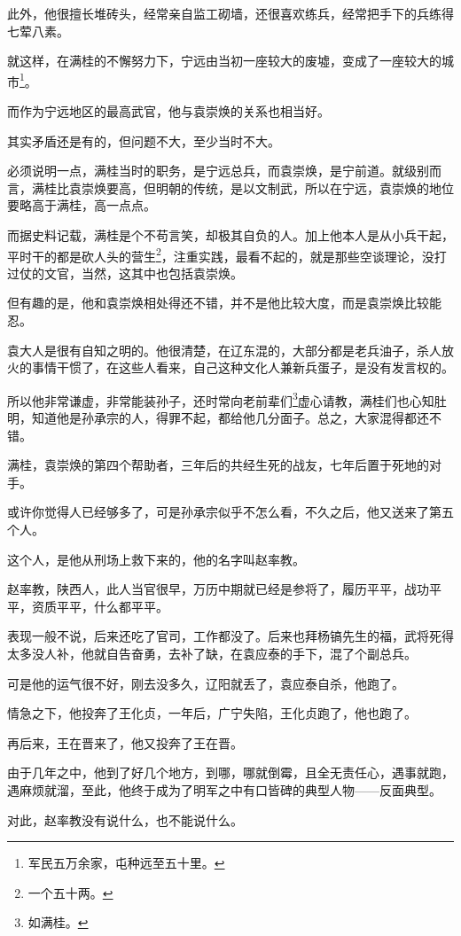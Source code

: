 \begin{multicols}{\theparacolNo}
		此外，他很擅长堆砖头，经常亲自监工砌墙，还很喜欢练兵，经常把手下的兵练得七荤八素。

		就这样，在满桂的不懈努力下，宁远由当初一座较大的废墟，变成了一座较大的城市\footnote{军民五万余家，屯种远至五十里。}。

		而作为宁远地区的最高武官，他与袁崇焕的关系也相当好。

		其实矛盾还是有的，但问题不大，至少当时不大。

		必须说明一点，满桂当时的职务，是宁远总兵，而袁崇焕，是宁前道。就级别而言，满桂比袁崇焕要高，但明朝的传统，是以文制武，所以在宁远，袁崇焕的地位要略高于满桂，高一点点。

		而据史料记载，满桂是个不苟言笑，却极其自负的人。加上他本人是从小兵干起，平时干的都是砍人头的营生\footnote{一个五十两。}，注重实践，最看不起的，就是那些空谈理论，没打过仗的文官，当然，这其中也包括袁崇焕。

		但有趣的是，他和袁崇焕相处得还不错，并不是他比较大度，而是袁崇焕比较能忍。

		袁大人是很有自知之明的。他很清楚，在辽东混的，大部分都是老兵油子，杀人放火的事情干惯了，在这些人看来，自己这种文化人兼新兵蛋子，是没有发言权的。

		所以他非常谦虚，非常能装孙子，还时常向老前辈们\footnote{如满桂。}虚心请教，满桂们也心知肚明，知道他是孙承宗的人，得罪不起，都给他几分面子。总之，大家混得都还不错。

		满桂，袁崇焕的第四个帮助者，三年后的共经生死的战友，七年后置于死地的对手。

		或许你觉得人已经够多了，可是孙承宗似乎不怎么看，不久之后，他又送来了第五个人。

		这个人，是他从刑场上救下来的，他的名字叫赵率教。

		赵率教，陕西人，此人当官很早，万历中期就已经是参将了，履历平平，战功平平，资质平平，什么都平平。

		表现一般不说，后来还吃了官司，工作都没了。后来也拜杨镐先生的福，武将死得太多没人补，他就自告奋勇，去补了缺，在袁应泰的手下，混了个副总兵。

		可是他的运气很不好，刚去没多久，辽阳就丢了，袁应泰自杀，他跑了。

		情急之下，他投奔了王化贞，一年后，广宁失陷，王化贞跑了，他也跑了。

		再后来，王在晋来了，他又投奔了王在晋。

		由于几年之中，他到了好几个地方，到哪，哪就倒霉，且全无责任心，遇事就跑，遇麻烦就溜，至此，他终于成为了明军之中有口皆碑的典型人物——反面典型。

		对此，赵率教没有说什么，也不能说什么。


\end{multicols}
